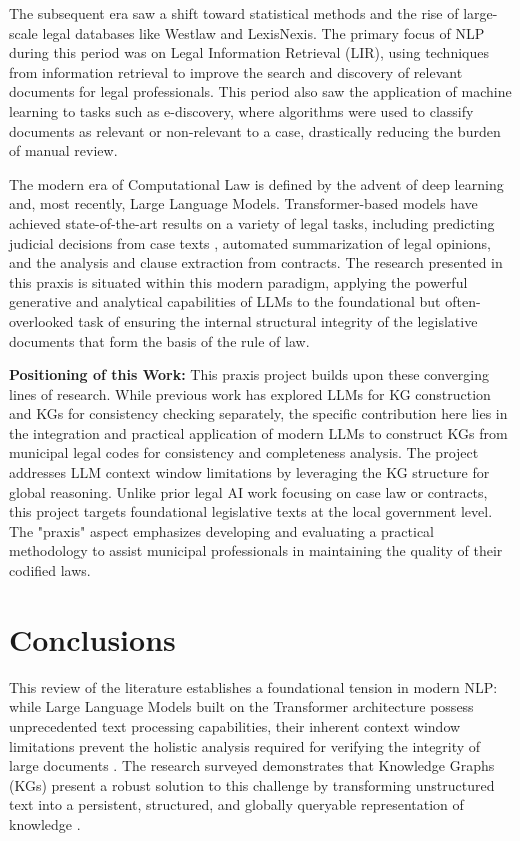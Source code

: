 The subsequent era saw a shift toward statistical methods and the rise of large-scale legal databases like Westlaw and LexisNexis. The primary focus of NLP during this period was on Legal Information Retrieval (LIR), using techniques from information retrieval to improve the search and discovery of relevant documents for legal professionals. This period also saw the application of machine learning to tasks such as e-discovery, where algorithms were used to classify documents as relevant or non-relevant to a case, drastically reducing the burden of manual review.

The modern era of Computational Law is defined by the advent of deep learning and, most recently, Large Language Models. Transformer-based models have achieved state-of-the-art results on a variety of legal tasks, including predicting judicial decisions from case texts \parencite{RefWorks:RefID:164-aletras2016predicting}, automated summarization of legal opinions, and the analysis and clause extraction from contracts. The research presented in this praxis is situated within this modern paradigm, applying the powerful generative and analytical capabilities of LLMs to the foundational but often-overlooked task of ensuring the internal structural integrity of the legislative documents that form the basis of the rule of law.

\textbf{Positioning of this Work:}
This praxis project builds upon these converging lines of research. While previous work has explored LLMs for KG construction and KGs for consistency checking separately, the specific contribution here lies in the integration and practical application of modern LLMs to construct KGs from municipal legal codes for consistency and completeness analysis. The project addresses LLM context window limitations by leveraging the KG structure for global reasoning. Unlike prior legal AI work focusing on case law or contracts, this project targets foundational legislative texts at the local government level. The "praxis" aspect emphasizes developing and evaluating a practical methodology to assist municipal professionals in maintaining the quality of their codified laws.

\section{Conclusions}

This review of the literature establishes a foundational tension in modern NLP: while Large Language Models built on the Transformer architecture possess unprecedented text processing capabilities, their inherent context window limitations prevent the holistic analysis required for verifying the integrity of large documents \parencite{RefWorks:RefID:81-vaswani2017attention, RefWorks:RefID:99-liu2025comprehensive}. The research surveyed demonstrates that Knowledge Graphs (KGs) present a robust solution to this challenge by transforming unstructured text into a persistent, structured, and globally queryable representation of knowledge \parencite{RefWorks:RefID:102-hogan2021knowledge}.

